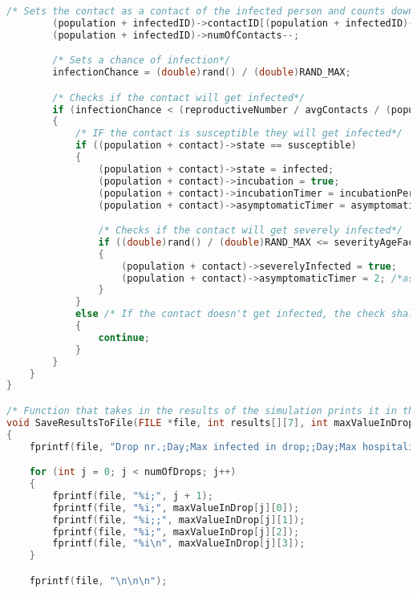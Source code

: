 \begin{lstlisting}[language=c, caption={Our simulations written in c}, captionpos=b, label={snippet:LABELNAVN}]
        /* Sets the contact as a contact of the infected person and counts down their number of contacts*/
        (population + infectedID)->contactID[(population + infectedID)->numOfContacts] = (population + contact)->ID;
        (population + infectedID)->numOfContacts--;

        /* Sets a chance of infection*/
        infectionChance = (double)rand() / (double)RAND_MAX;

        /* Checks if the contact will get infected*/
        if (infectionChance < (reproductiveNumber / avgContacts / (population + infectedID)->infectionPeriod))
        {
            /* IF the contact is susceptible they will get infected*/
            if ((population + contact)->state == susceptible)
            {
                (population + contact)->state = infected;
                (population + contact)->incubation = true;
                (population + contact)->incubationTimer = incubationPeriod;
                (population + contact)->asymptomaticTimer = asymptomaticPeriod;

                /* Checks if the contact will get severely infected*/
                if ((double)rand() / (double)RAND_MAX <= severityAgeFactor[(population + contact)->age])
                {
                    (population + contact)->severelyInfected = true;
                    (population + contact)->asymptomaticTimer = 2; /*assumption that severe infections have a short asymptomatic period.*/
                }
            }
            else /* If the contact doesn't get infected, the check shall then continue to the next contact*/
            {
                continue;
            }
        }
    }
}

/* Function that takes in the results of the simulation prints it in the file*/
void SaveResultsToFile(FILE *file, int results[][7], int maxValueInDrop[][4])
{
    fprintf(file, "Drop nr.;Day;Max infected in drop;;Day;Max hospitalized in drop\n");

    for (int j = 0; j < numOfDrops; j++)
    {
        fprintf(file, "%i;", j + 1);
        fprintf(file, "%i;", maxValueInDrop[j][0]);
        fprintf(file, "%i;;", maxValueInDrop[j][1]);
        fprintf(file, "%i;", maxValueInDrop[j][2]);
        fprintf(file, "%i\n", maxValueInDrop[j][3]);
    }

    fprintf(file, "\n\n\n");


\end{lstlisting}
